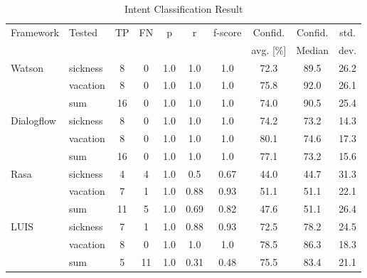\begin{table}[h]
    \centering
    \begin{tabular}{ l | l | c | c | c | c | c | c | c | c }
        \multirow{2}{*}{Framework} & \multirow{2}{*}{Tested} & \multirow{2}{*}{TP} & \multirow{2}{*}{FN} & \multirow{2}{*}{p} & \multirow{2}{*}{r} & \multirow{2}{*}{f-score} & Confid. & Confid. & std.\\ 
                 &&          &            &   & & & avg. [\%] & Median & dev.  \\ \hline \hline
        \multirow{3}{*}{Watson} 
        & sickness & 8 & 0& 1.0& 1.0& 1.0&72.3 & 89.5 & 26.2\\
        & vacation & 8 & 0& 1.0& 1.0& 1.0&75.8 & 92.0 & 26.1 \\
        & sum      &16 & 0& 1.0& 1.0& 1.0&74.0 &  90.5 & 25.4 \\ \hline
        
        \multirow{3}{*}{Dialogflow} 
        & sickness & 8& 0& 1.0& 1.0& 1.0&74.2&73.2 & 14.3\\
        & vacation & 8& 0& 1.0& 1.0& 1.0&80.1 & 74.6 & 17.3\\
        & sum      &16& 0& 1.0& 1.0& 1.0&77.1 & 73.2 & 15.6\\ \hline

        \multirow{3}{*}{Rasa} 
        & sickness & 4& 4& 1.0& 0.5  & 0.67& 44.0 &44.7 & 31.3\\
        & vacation & 7& 1& 1.0& 0.88& 0.93& 51.1&51.1& 22.1\\
        & sum      &11& 5& 1.0& 0.69& 0.82& 47.6&51.1 & 26.4\\ \hline

        \multirow{3}{*}{LUIS} 
        & sickness & 7& 1& 1.0& 0.88  & 0.93& 72.5&78.2& 24.5\\
        & vacation & 8& 0& 1.0& 1.0& 1.0& 78.5&86.3 & 18.3\\
        & sum      & 5&11& 1.0& 0.31& 0.48& 75.5&83.4 & 21.1\\
    \end{tabular}
    \caption{Intent Classification Result} \label{tab:intent_classification_result}
\end{table} \noindent

